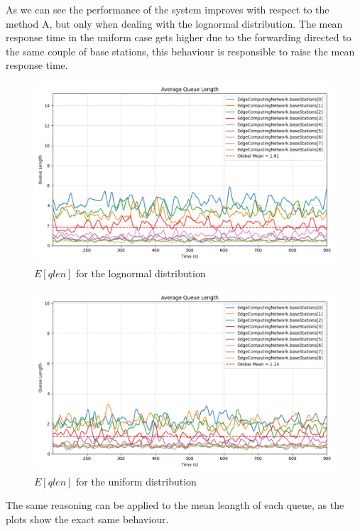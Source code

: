 \documentclass{report}
\begin{document}
As we can see the performance of the system improves with respect to the method A, but only when dealing with the lognormal distribution. The mean response time in the uniform case gets higher due to the forwarding directed to the same couple of base stations, this behaviour is responsible to raise the mean response time.

\begin{figure}[H]
    \centering
    \includegraphics[width=\textwidth]{img/plots/log_1e3_B/qlen.png}
    \caption{$E[qlen]$ for the lognormal distribution}
\end{figure}

\begin{figure}[H]
    \centering
    \includegraphics[width=\textwidth]{img/plots/uni_1e3_B/qlen.png}
    \caption{$E[qlen]$ for the uniform distribution}
\end{figure}


\begin{flushleft}
The same reasoning can be applied to the mean leangth of each queue, as the plots show the exact same behaviour.
\end{flushleft}
\end{document}
